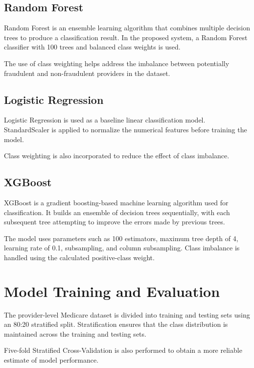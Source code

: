 \subsection{Random Forest}

Random Forest is an ensemble learning algorithm that combines multiple decision trees to produce a classification result. In the proposed system, a Random Forest classifier with 100 trees and balanced class weights is used.

The use of class weighting helps address the imbalance between potentially fraudulent and non-fraudulent providers in the dataset.

\subsection{Logistic Regression}

Logistic Regression is used as a baseline linear classification model. StandardScaler is applied to normalize the numerical features before training the model.

Class weighting is also incorporated to reduce the effect of class imbalance.

\subsection{XGBoost}

XGBoost is a gradient boosting-based machine learning algorithm used for classification. It builds an ensemble of decision trees sequentially, with each subsequent tree attempting to improve the errors made by previous trees.

The model uses parameters such as 100 estimators, maximum tree depth of 4, learning rate of 0.1, subsampling, and column subsampling. Class imbalance is handled using the calculated positive-class weight.

\section{Model Training and Evaluation}

The provider-level Medicare dataset is divided into training and testing sets using an 80:20 stratified split. Stratification ensures that the class distribution is maintained across the training and testing sets.

Five-fold Stratified Cross-Validation is also performed to obtain a more reliable estimate of model performance.

